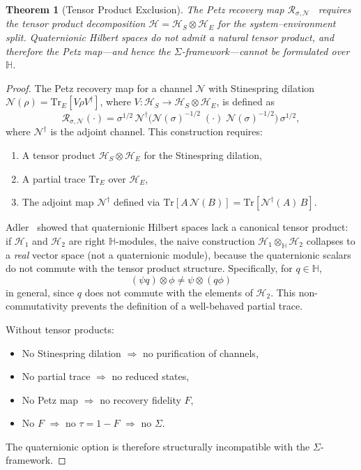 \documentclass[letterpaper,twocolumn,superscriptaddress,longbibliography]{revtex4-2}
\newtheorem{theorem}{Theorem}[section]
\newcommand{\Tr}{\mathrm{Tr}}
\newcommand{\Petz}{\mathcal{R}}
\newcommand{\chan}{\mathcal{N}}
\newcommand{\hilb}{\mathcal{H}}
\newcommand{\tauasym}{\tau}
\begin{document}
\begin{theorem}[Tensor Product Exclusion]
\label{thm:no_quaternionic}
The Petz recovery map $\Petz_{\sigma,\chan}$~\cite{Petz1986,Petz1988}
requires the tensor product decomposition
$\hilb = \hilb_S \otimes \hilb_E$ for the system--environment
split.  Quaternionic Hilbert spaces do not admit a natural
tensor product, and therefore the Petz map---and hence the
$\Sigma$-framework---cannot be formulated over $\mathbb{H}$.
\end{theorem}

\begin{proof}
The Petz recovery map for a channel $\chan$ with Stinespring
dilation $\chan(\rho) = \Tr_E[V\rho V^\dagger]$, where
$V: \hilb_S \to \hilb_S \otimes \hilb_E$, is defined
as~\cite{Petz1988,Wilde2013}
\begin{equation}
  \Petz_{\sigma,\chan}(\cdot)
  = \sigma^{1/2}\,\chan^\dagger\!\bigl(
    \chan(\sigma)^{-1/2}\;(\cdot)\;
    \chan(\sigma)^{-1/2}
  \bigr)\,\sigma^{1/2},
  \label{eq:petz_map}
\end{equation}
where $\chan^\dagger$ is the adjoint channel.
This construction requires:
\begin{enumerate}
  \item A tensor product $\hilb_S \otimes \hilb_E$ for the
        Stinespring dilation,
  \item A partial trace $\Tr_E$ over $\hilb_E$,
  \item The adjoint map $\chan^\dagger$ defined via
        $\Tr[A\,\chan(B)] = \Tr[\chan^\dagger(A)\,B]$.
\end{enumerate}

Adler~\cite{Adler1995} showed that quaternionic Hilbert
spaces lack a canonical tensor product: if $\hilb_1$ and
$\hilb_2$ are right $\mathbb{H}$-modules, the naive
construction $\hilb_1 \otimes_{\mathbb{H}} \hilb_2$
collapses to a \emph{real} vector space (not a quaternionic
module), because the quaternionic scalars do not commute
with the tensor product structure.
Specifically, for $q \in \mathbb{H}$,
\begin{equation}
  (\psi q) \otimes \phi \neq \psi \otimes (q\phi)
  \label{eq:quat_fail}
\end{equation}
in general, since $q$ does not commute with the elements
of $\hilb_2$.  This non-commutativity prevents the definition
of a well-behaved partial trace.

Without tensor products:
\begin{itemize}
  \item No Stinespring dilation $\Rightarrow$ no purification
        of channels,
  \item No partial trace $\Rightarrow$ no reduced states,
  \item No Petz map $\Rightarrow$ no recovery fidelity $F$,
  \item No $F$ $\Rightarrow$ no $\tauasym = 1 - F$
        $\Rightarrow$ no $\Sigma$.
\end{itemize}
The quaternionic option is therefore structurally incompatible
with the $\Sigma$-framework.
\end{proof}
\end{document}
